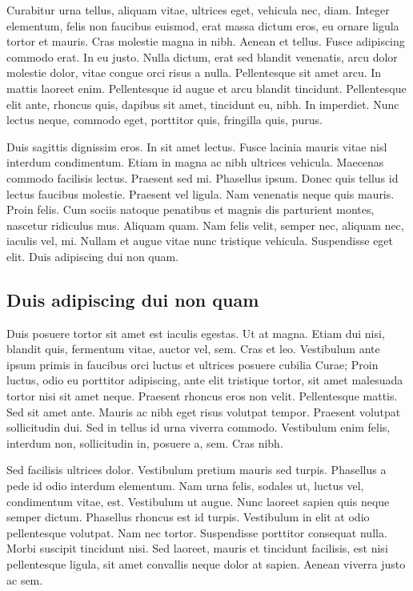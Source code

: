 \documentclass[../hdr.tex]{subfiles}
\begin{document}
Curabitur urna tellus, aliquam vitae, ultrices eget, vehicula nec, diam. Integer
elementum, felis non faucibus euismod, erat massa dictum eros, eu ornare ligula
tortor et mauris. Cras molestie magna in nibh. Aenean et tellus. Fusce
adipiscing commodo erat. In eu justo. Nulla dictum, erat sed blandit venenatis,
arcu dolor molestie dolor, vitae congue orci risus a nulla. Pellentesque sit
amet arcu. In mattis laoreet enim. Pellentesque id augue et arcu blandit
tincidunt. Pellentesque elit ante, rhoncus quis, dapibus sit amet, tincidunt eu,
nibh. In imperdiet. Nunc lectus neque, commodo eget, porttitor quis, fringilla
quis, purus.

Duis sagittis dignissim eros. In sit amet lectus. Fusce lacinia mauris vitae
nisl interdum condimentum. Etiam in magna ac nibh ultrices vehicula. Maecenas
commodo facilisis lectus. Praesent sed mi. Phasellus ipsum. Donec quis tellus id
lectus faucibus molestie. Praesent vel ligula. Nam venenatis neque quis mauris.
Proin felis. Cum sociis natoque penatibus et magnis dis parturient montes,
nascetur ridiculus mus. Aliquam quam. Nam felis velit, semper nec, aliquam nec,
iaculis vel, mi. Nullam et augue vitae nunc tristique vehicula. Suspendisse eget
elit. Duis adipiscing dui non quam.

\subsection{Duis adipiscing dui non quam}

Duis posuere tortor sit amet est iaculis egestas. Ut at magna. Etiam dui nisi,
blandit quis, fermentum vitae, auctor vel, sem. Cras et leo. Vestibulum ante
ipsum primis in faucibus orci luctus et ultrices posuere cubilia Curae; Proin
luctus, odio eu porttitor adipiscing, ante elit tristique tortor, sit amet
malesuada tortor nisi sit amet neque. Praesent rhoncus eros non velit.
Pellentesque mattis. Sed sit amet ante. Mauris ac nibh eget risus volutpat
tempor. Praesent volutpat sollicitudin dui. Sed in tellus id urna viverra
commodo. Vestibulum enim felis, interdum non, sollicitudin in, posuere a, sem.
Cras nibh.

Sed facilisis ultrices dolor. Vestibulum pretium mauris sed turpis. Phasellus a
pede id odio interdum elementum. Nam urna felis, sodales ut, luctus vel,
condimentum vitae, est. Vestibulum ut augue. Nunc laoreet sapien quis neque
semper dictum. Phasellus rhoncus est id turpis. Vestibulum in elit at odio
pellentesque volutpat. Nam nec tortor. Suspendisse porttitor consequat nulla.
Morbi suscipit tincidunt nisi. Sed laoreet, mauris et tincidunt facilisis, est
nisi pellentesque ligula, sit amet convallis neque dolor at sapien. Aenean
viverra justo ac sem.
\end{document}
